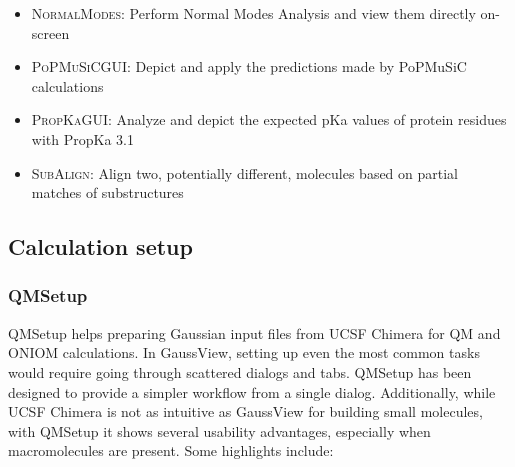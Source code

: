 \begin{itemize}
	\begin{itemize}
		\item \textsc{NormalModes}: Perform Normal Modes Analysis and view them directly on-screen

		\item \textsc{PoPMuSiCGUI}: Depict and apply the predictions made by PoPMuSiC calculations

		\item \textsc{PropKaGUI}: Analyze and depict the expected pKa values of protein residues with PropKa 3.1

		\item \textsc{SubAlign}: Align two, potentially different, molecules based on partial matches of substructures
	\end{itemize}
\end{itemize}

\subsection{Calculation setup}
\subsubsection{QMSetup}
QMSetup helps preparing Gaussian input files from UCSF Chimera for QM and ONIOM calculations. In GaussView, setting up even the most common tasks would require going through scattered dialogs and tabs. QMSetup has been designed to provide a simpler workflow from a single dialog. Additionally, while UCSF Chimera is not as intuitive as GaussView for building small molecules, with QMSetup it shows several usability advantages, especially when macromolecules are present. Some highlights include:

